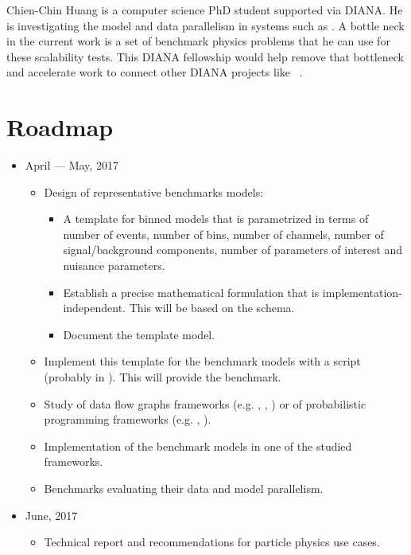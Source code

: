 Chien-Chin Huang is a computer science PhD student supported via DIANA.
He is investigating the model and data parallelism in systems such as .
A bottle neck in the current work is a set of benchmark physics problems that he can use for these scalability tests.
This DIANA fellowship would help remove that bottleneck and accelerate work to connect other DIANA projects like ~\cite{histogrammar2017}.

\section{Roadmap}
\begin{itemize}
	\item April --- May, 2017
	      \begin{itemize}
	      	\item Design of representative benchmarks models:
	      	      \begin{itemize}
	      	      	\item A template for binned models that is parametrized in terms of number of events, number of bins, number of channels, number of signal/background components, number of parameters of interest and nuisance parameters.
	      	      	\item Establish a precise mathematical formulation that is implementation-independent.
	      	      	      This will be based on the  schema.
	      	      	\item Document the template model.
	      	      \end{itemize}
	      	\item Implement this template for the benchmark models with a  script (probably in ).
	      	      This will provide the  benchmark.
	      	\item Study of data flow graphs frameworks (e.g. , , ) or of probabilistic programming frameworks (e.g. , ).
	      	\item Implementation of the benchmark models in one of the studied frameworks.
	      	\item Benchmarks evaluating their data and model parallelism.
	      \end{itemize}
	\item June, 2017
	      \begin{itemize}
	      	\item Technical report and recommendations for particle physics use cases.

\end{itemize}
\end{itemize}
